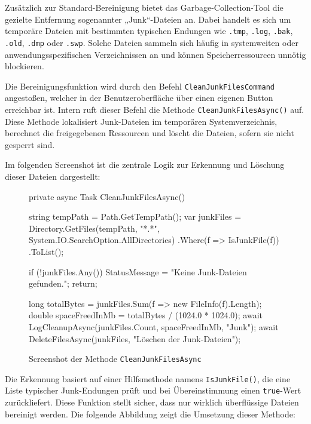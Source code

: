 
Zusätzlich zur Standard-Bereinigung bietet das Garbage-Collection-Tool die gezielte Entfernung sogenannter „Junk“-Dateien an. Dabei handelt es sich um temporäre Dateien mit bestimmten typischen Endungen wie \texttt{.tmp}, \texttt{.log}, \texttt{.bak}, \texttt{.old}, \texttt{.dmp} oder \texttt{.swp}. Solche Dateien sammeln sich häufig in systemweiten oder anwendungsspezifischen Verzeichnissen an und können Speicherressourcen unnötig blockieren.

Die Bereinigungsfunktion wird durch den Befehl \texttt{CleanJunkFilesCommand} angestoßen, welcher in der Benutzeroberfläche über einen eigenen Button erreichbar ist. Intern ruft dieser Befehl die Methode \texttt{CleanJunkFilesAsync()} auf. Diese Methode lokalisiert Junk-Dateien im temporären Systemverzeichnis, berechnet die freigegebenen Ressourcen und löscht die Dateien, sofern sie nicht gesperrt sind.

Im folgenden Screenshot ist die zentrale Logik zur Erkennung und Löschung dieser Dateien dargestellt:

\begin{figure}[H]
    \centering
    \begin{cs}
private async Task CleanJunkFilesAsync()
{
    string tempPath = Path.GetTempPath();
    var junkFiles = Directory.GetFiles(tempPath, "*.*", System.IO.SearchOption.AllDirectories)
                                .Where(f => IsJunkFile(f))
                                .ToList();

    if (!junkFiles.Any())
    {
        StatusMessage = "Keine Junk-Dateien gefunden.";
        return;
    }

    long totalBytes = junkFiles.Sum(f => new FileInfo(f).Length);
    double spaceFreedInMb = totalBytes / (1024.0 * 1024.0);
    await LogCleanupAsync(junkFiles.Count, spaceFreedInMb, "Junk");
    await DeleteFilesAsync(junkFiles, "Löschen der Junk-Dateien");
}
\end{cs}
    \caption{Screenshot der Methode \texttt{CleanJunkFilesAsync}}
\end{figure}

Die Erkennung basiert auf einer Hilfsmethode namens \texttt{IsJunkFile()}, die eine Liste typischer Junk-Endungen prüft und bei Übereinstimmung einen \texttt{true}-Wert zurückliefert. Diese Funktion stellt sicher, dass nur wirklich überflüssige Dateien bereinigt werden. Die folgende Abbildung zeigt die Umsetzung dieser Methode:

